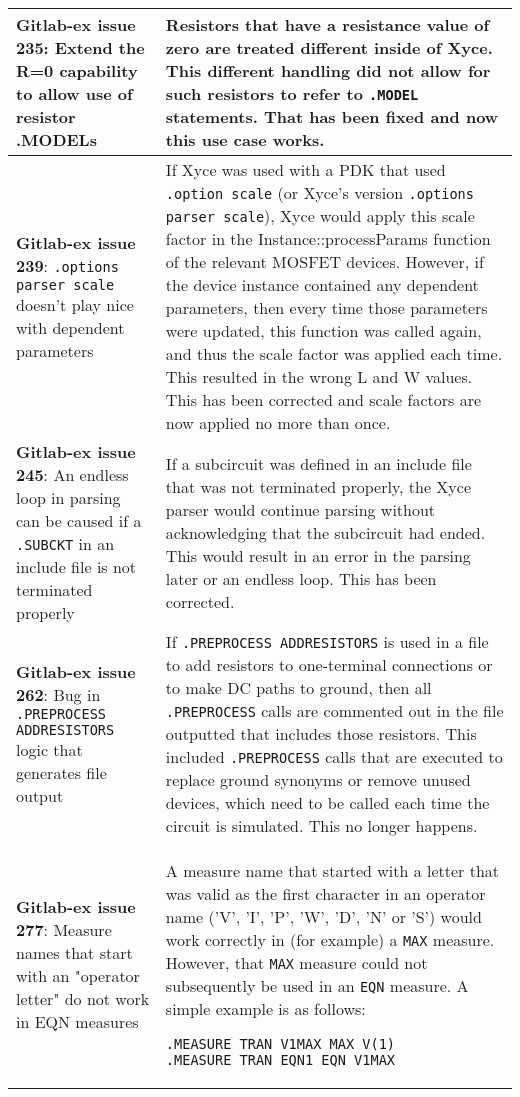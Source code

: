 {\begin{longtable}[h] {>{\raggedright\small}m{2in}|>{\raggedright\let\\\tabularnewline\small}m{3.5in}}
  \textbf{Gitlab-ex issue 235}: Extend the R=0 capability to allow use
of resistor .MODELs & Resistors that have a resistance value of zero
are treated different inside of Xyce.  This different handling did not
allow for such resistors to refer to \texttt{.MODEL} statements.  That
has been fixed and now this use case works.  \\ \hline

  \textbf{Gitlab-ex issue 239}: \texttt{.options parser scale} doesn't
play nice with dependent parameters & If Xyce was used with a PDK that
used \texttt{.option scale} (or Xyce's version \texttt{.options parser
scale}), Xyce would apply this scale factor in the
Instance::processParams function of the relevant MOSFET devices.
However, if the device instance contained any dependent parameters,
then every time those parameters were updated, this function was
called again, and thus the scale factor was applied each time. This
resulted in the wrong L and W values.  This has been corrected and
scale factors are now applied no more than once.  \\ \hline

  \textbf{Gitlab-ex issue 245}: An endless loop in parsing can be caused 
if a \texttt{.SUBCKT} in an include file is not terminated properly &
If a subcircuit was defined in an include file that was not terminated
properly, the Xyce parser would continue parsing without acknowledging
that the subcircuit had ended.  This would result in an error in the
parsing later or an endless loop.  This has been corrected. \\ \hline
 
  \textbf{Gitlab-ex issue 262}: Bug in \texttt{.PREPROCESS ADDRESISTORS} 
logic that generates file output & If \texttt{.PREPROCESS ADDRESISTORS}
is used in a file to add resistors to one-terminal connections or to
make DC paths to ground, then all \texttt{.PREPROCESS} calls are 
commented out in the file outputted that includes those resistors.
This included \texttt{.PREPROCESS} calls that are executed to replace
ground synonyms or remove unused devices, which need to be called each
time the circuit is simulated.  This no longer happens. \\ \hline

  \textbf{Gitlab-ex issue 277}: Measure names that start with an "operator
letter" do not work in EQN measures & A measure name that started with a
letter that was valid as the first character in an operator name ('V', 'I',
'P', 'W', 'D', 'N' or 'S') would work correctly in (for example) a
\texttt{MAX} measure.  However, that \texttt{MAX} measure could not
subsequently be used in an \texttt{EQN} measure.  A simple example is
as follows:
\begin{verbatim}
.MEASURE TRAN V1MAX MAX V(1)
.MEASURE TRAN EQN1 EQN V1MAX
\end{verbatim}
\\ \hline


\end{longtable}}
